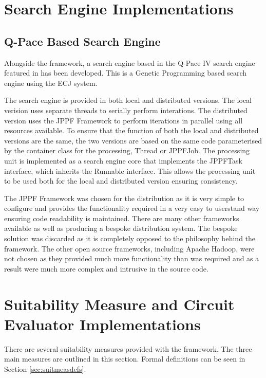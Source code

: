 \section{Search Engine Implementations}
\label{sec:provsearcheng}
\subsection{Q-Pace Based Search Engine}
Alongside the framework, a search engine based in the Q-Pace IV search engine featured in \cite{masseythesis} has been developed.
This is a Genetic Programming based search engine using the ECJ\cite{ecjtool} system.

The search engine is provided in both local and distributed versions.
The local verision uses separate threads to serially perform interations.
The distributed version uses the JPPF Framework to perform iterations in parallel using all resources available.
To ensure that the function of both the local and distributed versions are the same, the two versions are based on the same code parameterised by the container class for the processing, Thread or JPPFJob.
The processing unit is implemented as a search engine core that implements the JPPFTask interface, which inherits the Runnable interface.
This allows the processing unit to be used both for the local and distributed version ensuring consistency.

The JPPF Framework was chosen for the distribution as it is very simple to configure and provides the functionality required in a very easy to userstand way ensuring code readability is maintained.
There are many other frameworks available as well as producing a bespoke distribution system.
The bespoke solution was discarded as it is completely opposed to the philosophy behind the framework.
The other open source frameworks, including Apache Hadoop\cite{apahadoop}, were not chosen as they provided much more functionality than was required and as a result were much more complex and intrusive in the source code.


\section{Suitability Measure and Circuit Evaluator Implementations}
\label{sec:provsuitmeas}

There are several suitability measures provided with the framework.
The three main measures are outlined in this section.
Formal definitions can be seen in Section \ref{sec:suitmeasdefs}.

